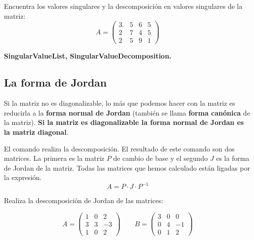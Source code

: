 \documentclass[a4paper,10pt, draft]{article}
\newcommand{\com}[1]{\textbf{\color{blue}{#1}}}
\newenvironment{ejer}{\begin{tcolorbox}[center title, title=Ejercicios,
fonttitle=\sffamily\bfseries,colback=blue!5,colframe=orange]}{\end{tcolorbox}}
\newenvironment{funciones}{\begin{tcolorbox}[center title, title=Nuevas funciones, fonttitle=\sffamily\bfseries, colback=green!5!white,colframe=red!75!black]}{\end{tcolorbox}\bigskip}
\begin{document}
\begin{ejer}

Encuentra los valores singulares y la descomposición en valores singulares de la matriz:
$$
A=
\begin{pmatrix}
3. & 5 &6 & 5\\
2& 7&4 & 5\\
2&5&9 & 1
\end{pmatrix}
$$



\end{ejer}

\begin{funciones}

\textbf{SingularValueList, SingularValueDecomposition.}

\end{funciones}




\newpage


\subsection{La forma de Jordan}

Si la matriz no es diagonalizable, lo más que podemos hacer con la matriz es reducirla a la \textbf{forma normal de Jordan} (también se llama \textbf{forma canónica} de la matriz). \textbf{Si la matriz es diagonalizable la forma normal de Jordan es la matriz diagonal}. 

El comando  \com{JordanDecomposition[A]} realiza la descomposición. El resultado de este comando son dos  matrices. La primera es la matriz $P$  de cambio de base
y el segundo $J$ es la forma de Jordan de la matriz. Todas las matrices que hemos calculado están ligadas por la expresión.
$$
A=P\cdot J \cdot P^{-1}
$$



\begin{ejer}

Realiza la descomposición de Jordan de las matrices:

$$
A=
\begin{pmatrix}
1 & 0 &2\\
3& 3&-3\\
1&0&2
\end{pmatrix}
\qquad 
B=
\begin{pmatrix}
3 & 0 & 0\\
0 & 4 & -1\\
0 & 1 & 2
\end{pmatrix}
$$




\end{ejer}
\end{document}
